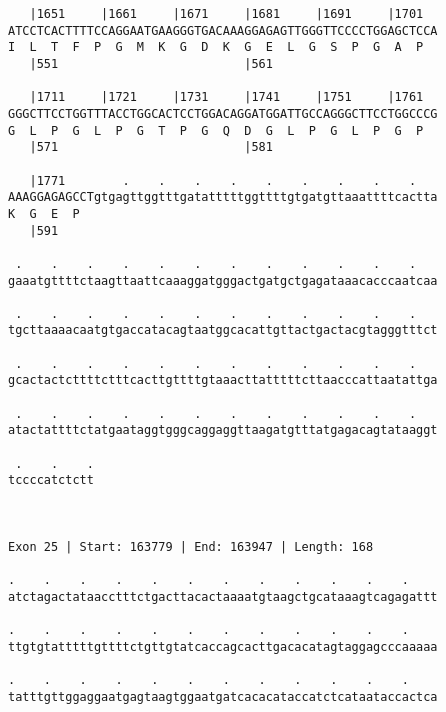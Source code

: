 \documentclass{article}
\begin{document}
\begin{Verbatim}
   |1651     |1661     |1671     |1681     |1691     |1701  
ATCCTCACTTTTCCAGGAATGAAGGGTGACAAAGGAGAGTTGGGTTCCCCTGGAGCTCCA
I  L  T  F  P  G  M  K  G  D  K  G  E  L  G  S  P  G  A  P  
   |551                          |561                       
  
   |1711     |1721     |1731     |1741     |1751     |1761  
GGGCTTCCTGGTTTACCTGGCACTCCTGGACAGGATGGATTGCCAGGGCTTCCTGGCCCG
G  L  P  G  L  P  G  T  P  G  Q  D  G  L  P  G  L  P  G  P  
   |571                          |581                       
  
   |1771        .    .    .    .    .    .    .    .    .   
AAAGGAGAGCCTgtgagttggtttgatatttttggttttgtgatgttaaattttcactta
K  G  E  P                                                  
   |591                                                     
  
 .    .    .    .    .    .    .    .    .    .    .    .   
gaaatgttttctaagttaattcaaaggatgggactgatgctgagataaacacccaatcaa
                                                            
 .    .    .    .    .    .    .    .    .    .    .    .   
tgcttaaaacaatgtgaccatacagtaatggcacattgttactgactacgtagggtttct
                                                            
 .    .    .    .    .    .    .    .    .    .    .    .   
gcactactcttttctttcacttgttttgtaaacttatttttcttaacccattaatattga
                                                            
 .    .    .    .    .    .    .    .    .    .    .    .   
atactattttctatgaataggtgggcaggaggttaagatgtttatgagacagtataaggt
                                                            
 .    .    .
tccccatctctt
            
            
 
Exon 25 | Start: 163779 | End: 163947 | Length: 168
 
.    .    .    .    .    .    .    .    .    .    .    .    
atctagactataacctttctgacttacactaaaatgtaagctgcataaagtcagagattt
                                                            
.    .    .    .    .    .    .    .    .    .    .    .    
ttgtgtatttttgttttctgttgtatcaccagcacttgacacatagtaggagcccaaaaa
                                                            
.    .    .    .    .    .    .    .    .    .    .    .    
tatttgttggaggaatgagtaagtggaatgatcacacataccatctcataataccactca
                                                            

\end{Verbatim}
\end{document}
